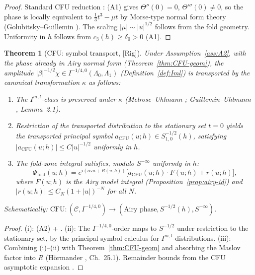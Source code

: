 \documentclass[12pt,a4paper]{amsart}
\newtheorem{theorem}{Theorem}[section]
\theoremstyle{definition}
\theoremstyle{remark}
\newcommand{\Rig}{\textup{[Rig]}}
\begin{document}
\begin{proof}
Standard CFU reduction \cite{CFU1957}:
(A1) gives $\Theta''(0)=0$, $\Theta'''(0)\ne 0$,
so the phase is locally equivalent to
$\frac{1}{3}t^3-\mu t$ by Morse-type normal form theory
(Golubitsky--Guillemin \cite{Golub1973}).
The scaling $|\mu|\sim|u|^{1/2}$ follows from the
fold geometry.
Uniformity in $h$ follows from $c_3(h)\ge\delta_0>0$ (A1).
\end{proof}

\begin{theorem}[CFU: symbol transport, \Rig]
\label{thm:CFU-symbol}
Under Assumption~\ref{ass:A2},
with the phase already in Airy normal form
(Theorem~\ref{thm:CFU-geom}),
the amplitude $|\beta|^{-1/2}\chi
\in I^{-1/4,0}(\Lambda_0,\Lambda_1)$
(Definition~\ref{def:Iml})
is transported by the canonical transformation $\kappa$
as follows:
\begin{enumerate}[\rm(i)]
\item The $I^{m,l}$-class is preserved under $\kappa$
  (Melrose--Uhlmann \cite{MelroseU1979};
  Guillemin--Uhlmann \cite{GuillemU1981}, Lemma~2.1).
\item Restriction of the transported distribution to
  the stationary set $t=0$ yields the
  \emph{transported principal symbol}
  $a_{\mathrm{CFU}}(u;h)\in S^{-1/2}_{1,0}(h)$,
  satisfying $|a_{\mathrm{CFU}}(u;h)|\le C|u|^{-1/2}$
  uniformly in $h$.
\item The fold-zone integral satisfies,
  modulo $S^{-\infty}$ uniformly in $h$:
  \begin{equation}\label{eq:CFU}
    \Phi_{\mathrm{fold}}(u;h)
    = e^{i(\alpha_*u+R(u;h))}
    \bigl[
      a_{\mathrm{CFU}}(u;h)\cdot F(u;h)
      + r(u;h)
    \bigr],
  \end{equation}
  where $F(u;h)$ is the Airy model integral
  (Proposition~\ref{prop:airy-id})
  and $|r(u;h)|\le C_N(1+|u|)^{-N}$ for all $N$.
\end{enumerate}
Schematically:
$\mathrm{CFU}:(\mathcal{C},I^{-1/4,0})
\longrightarrow
(\text{Airy phase},S^{-1/2}(h),S^{-\infty}).$
\end{theorem}

\begin{proof}
(i): (A2) + \cite{MelroseU1979,GuillemU1981}.
(ii): The $I^{-1/4,0}$-order maps to $S^{-1/2}$
under restriction to the stationary set,
by the principal symbol calculus for $I^{m,l}$-distributions.
(iii): Combining (i)--(ii) with Theorem~\ref{thm:CFU-geom}
and absorbing the Maslov factor into $R$
(H\"ormander \cite{Hormander1983}, Ch.~25.1).
Remainder bounds from the CFU asymptotic expansion \cite{CFU1957}.
\end{proof}
\end{document}
